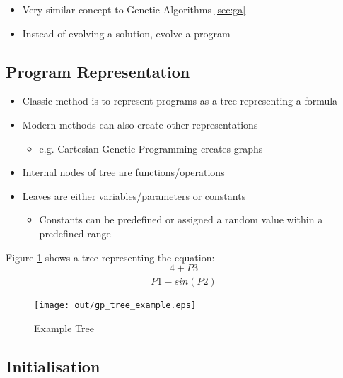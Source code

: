 \documentclass[a4paper]{article}
\begin{document}
\begin{itemize}
  \item Very similar concept to Genetic Algorithms \ref{sec:ga}
  \item Instead of evolving a solution, evolve a program

\end{itemize}

\subsection{Program Representation}

\begin{itemize}
  \item Classic method is to represent programs as a tree representing a
        formula
  \item Modern methods can also create other representations
    \begin{itemize}
      \item e.g. Cartesian Genetic Programming creates graphs
    \end{itemize}
  \item Internal nodes of tree are functions/operations
  \item Leaves are either variables/parameters or constants
    \begin{itemize}
      \item Constants can be predefined or assigned a random value within a
            predefined range
    \end{itemize}
\end{itemize}


Figure \ref{fig:gp_tree_example} shows a tree representing the equation:
\[
  \frac{4 + P3}{P1 - sin(P2)}
\]

\begin{figure}[h!]
  \centering
  \texttt{[image: out/gp\_tree\_example.eps]}
  \caption{Example Tree}
  \label{fig:gp_tree_example}
\end{figure}
\FloatBarrier

\subsection{Initialisation}
\end{document}
